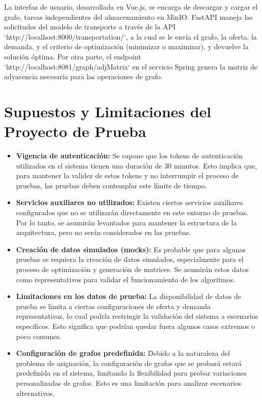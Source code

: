 \documentclass[stu, 12pt, letterpaper, donotrepeattitle, floatsintext, natbib]{apa7}
\begin{document}
La interfaz de usuario, desarrollada en Vue.js, se encarga de descargar y cargar el grafo, tareas independientes del almacenamiento en MinIO. FastAPI maneja las solicitudes del modelo de transporte a través de la API `http://localhost:8000/transportation/`, a la cual se le envía el grafo, la oferta, la demanda, y el criterio de optimización (minimizar o maximizar), y devuelve la solución óptima. Por otra parte, el endpoint `http://localhost:8081/graph/adjMatrix` en el servicio Spring genera la matriz de adyacencia necesaria para las operaciones de grafo.

\section{\large Supuestos y Limitaciones del Proyecto de Prueba}

\begin{itemize}
    \item \textbf{Vigencia de autenticación:} Se supone que los tokens de autenticación utilizados en el sistema tienen una duración de 30 minutos. Esto implica que, para mantener la validez de estos tokens y no interrumpir el proceso de pruebas, las pruebas deben contemplar este límite de tiempo.
    
    \item \textbf{Servicios auxiliares no utilizados:} Existen ciertos servicios auxiliares configurados que no se utilizarán directamente en este entorno de pruebas. Por lo tanto, se asumirán levantados para mantener la estructura de la arquitectura, pero no serán considerados en las pruebas.
    
    \item \textbf{Creación de datos simulados (mocks):} Es probable que para algunas pruebas se requiera la creación de datos simulados, especialmente para el proceso de optimización y generación de matrices. Se asumirán estos datos como representativos para validar el funcionamiento de los algoritmos.

    \item \textbf{Limitaciones en los datos de prueba:} La disponibilidad de datos de prueba se limita a ciertas configuraciones de oferta y demanda representativas, lo cual podría restringir la validación del sistema a escenarios específicos. Esto significa que podrían quedar fuera algunos casos extremos o poco comunes.
    
    \item \textbf{Configuración de grafos predefinida:} Debido a la naturaleza del problema de asignación, la configuración de grafos que se probará estará predefinida en el sistema, limitando la flexibilidad para probar variaciones personalizadas de grafos. Esto es una limitación para analizar escenarios alternativos.
\end{itemize}
\end{document}
